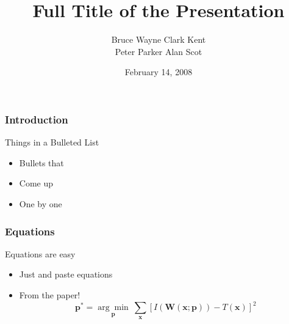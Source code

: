 \documentclass[serif,mathserif]{beamer}
\author[Bruce Wayne]{Bruce Wayne \quad Clark Kent\\Peter Parker \quad Alan Scot}
\title[Short Title\hspace{2em}\insertframenumber/\inserttotalframenumber]{Full Title of the Presentation}
\date{February 14, 2008} %
\institute{Level2.lu}
\begin{document}
\maketitle


\begin{frame}
  \frametitle{Introduction}
  Things in a Bulleted List\pause
  \begin{itemize}
  \item Bullets that\pause
  \item Come up\pause
  \item One by one %
  \end{itemize}
\end{frame}


\begin{frame}
  \frametitle{Equations}
  Equations are easy
  \begin{itemize}
  \item Just and paste equations\pause
  \item From the paper!
    \begin{equation*}
      \textbf{p}^* = \underset{\textbf{p}}{\arg\!\min}~\sum_{\textbf{x}}\left[ I(\textbf{W}(\textbf{x};\textbf{p})) - T(\textbf{x}) \right]^2
    \end{equation*}
  \end{itemize}
\end{frame}

\end{document}
